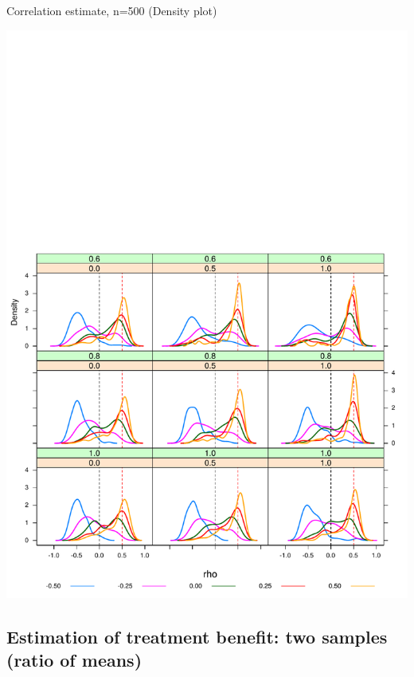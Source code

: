 \begin{frame}{Correlation estimate, n=500 (Density plot)}

\begin{center}
  \includegraphics[trim= 0cm 0cm 0cm 11.75cm, clip, scale=0.475]{Figure1/tbl1densityPlot_n500.pdf} %
\end{center}

\end{frame}

\subsection{Estimation of treatment benefit: two samples (ratio of
means)}
\protect\hypertarget{estimation-of-treatment-benefit-two-samples-ratio-of-means}{}

